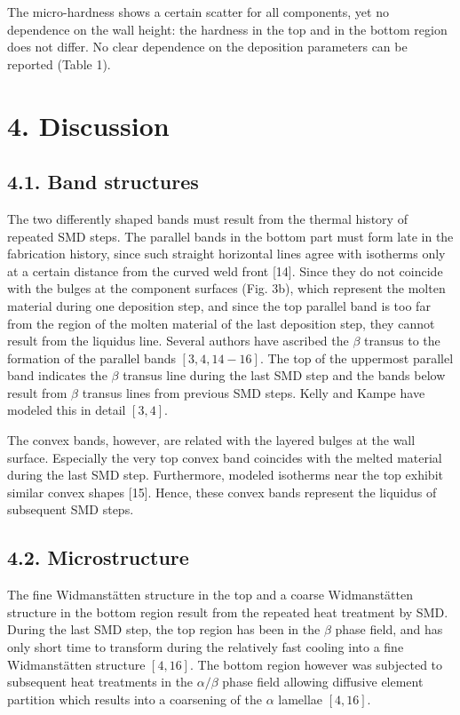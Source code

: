 \documentclass[10pt]{article}
\begin{document}
The micro-hardness shows a certain scatter for all components, yet no dependence on the wall height: the hardness in the top and in the bottom region does not differ. No clear dependence on the deposition parameters can be reported (Table 1).

\section*{4. Discussion}
\subsection*{4.1. Band structures}
The two differently shaped bands must result from the thermal history of repeated SMD steps. The parallel bands in the bottom part must form late in the fabrication history, since such straight horizontal lines agree with isotherms only at a certain distance from the curved weld front [14]. Since they do not coincide with the bulges at the component surfaces (Fig. 3b), which represent the molten material during one deposition step, and since the top parallel band is too far from the region of the molten material of the last deposition step, they cannot result from the liquidus line. Several authors have ascribed the $\beta$ transus to the formation of the parallel bands $[3,4,14-16]$. The top of the uppermost parallel band indicates the $\beta$ transus line during the last SMD step and the bands below result from $\beta$ transus lines from previous SMD steps. Kelly and Kampe have modeled this in detail $[3,4]$.

The convex bands, however, are related with the layered bulges at the wall surface. Especially the very top convex band coincides with the melted material during the last SMD step. Furthermore, modeled isotherms near the top exhibit similar convex shapes [15]. Hence, these convex bands represent the liquidus of subsequent SMD steps.

\subsection*{4.2. Microstructure}
The fine Widmanstätten structure in the top and a coarse Widmanstätten structure in the bottom region result from the repeated heat treatment by SMD. During the last SMD step, the top region has been in the $\beta$ phase field, and has only short time to transform during the relatively fast cooling into a fine Widmanstätten structure $[4,16]$. The bottom region however was subjected to subsequent heat treatments in the $\alpha / \beta$ phase field allowing diffusive element partition which results into a coarsening of the $\alpha$ lamellae $[4,16]$.
\end{document}
